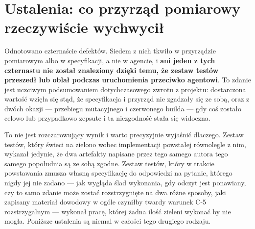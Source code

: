 \documentclass[11pt,a4paper]{article}
\begin{document}
\section{Ustalenia: co przyrząd pomiarowy rzeczywiście wychwycił}
\label{sec:ustalenia}

Odnotowano czternaście defektów. Siedem z nich tkwiło w przyrządzie pomiarowym albo
w specyfikacji, a nie w agencie, i \textbf{ani jeden z tych czternastu nie został
znaleziony dzięki temu, że zestaw testów przeszedł lub oblał podczas uruchomienia
przeciwko agentowi}. To zdanie jest uczciwym podsumowaniem dotychczasowego zwrotu
z projektu: dostarczona wartość wzięła się stąd, że specyfikacja i przyrząd nie
zgadzały się ze sobą, oraz z dwóch okazji --- przebiegu mutacyjnego i czerwonego
builda --- gdy coś zostało celowo lub przypadkowo zepsute i ta niezgodność stała
się widoczna.

To nie jest rozczarowujący wynik i warto precyzyjnie wyjaśnić dlaczego. Zestaw
testów, który świeci na zielono wobec implementacji powstałej równolegle z nim,
wykazał jedynie, że dwa artefakty napisane przez tego samego autora tego samego
popołudnia są ze sobą zgodne. Zestaw testów, który w trakcie powstawania zmusza
własną specyfikację do odpowiedzi na pytanie, którego nigdy jej nie zadano ---
jak wygląda ślad wykonania, gdy odczyt jest ponawiany, czy to samo zdanie może
zostać rozstrzygnięte na dwa różne sposoby, jaki zapisany materiał dowodowy w
ogóle czyniłby twardy warunek C-5 rozstrzygalnym --- wykonał pracę, której żadna
ilość zieleni wykonać by nie mogła. Poniższe ustalenia są niemal w całości tego
drugiego rodzaju.
\end{document}
